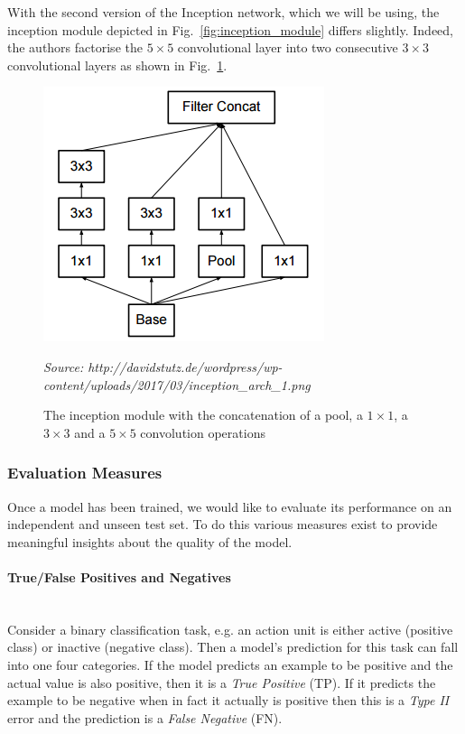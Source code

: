 \documentclass[12pt,twoside]{article}
\newcommand{\source}[1]{\vspace{-3pt} \caption*{ \footnotesize{\textit{Source: {#1}}}} }
\newcommand{\para}[1]{\paragraph{#1}\mbox{}\\}
\begin{document}
With the second version of the Inception network, which we will be using, the
inception module depicted in Fig.~\ref{fig:inception_module} differs slightly.
Indeed, the authors factorise the $5 \times 5$ convolutional layer into two
consecutive $3 \times 3$ convolutional layers as shown in
Fig.~\ref{fig:inception_v2_module}.

\begin{figure}[ht]

  \centering
  \includegraphics[scale=0.8]{figures/inception_v2_module.png}
  \caption{The inception module with the concatenation of a pool, a $1 \times
  1$, a $3 \times 3$ and a $5 \times 5$ convolution operations}
  \source{http://davidstutz.de/wordpress/wp-content/uploads/2017/03/inception\_arch\_1.png}
  \label{fig:inception_v2_module}
\end{figure}


\subsubsection{Evaluation Measures}

Once a model has been trained, we would like to evaluate its performance on an
independent and unseen test set. To do this various measures exist to provide
meaningful insights about the quality of the model.

\para{True/False Positives and Negatives}

Consider a binary classification task, e.g. an action unit is either active
(positive class) or inactive (negative class). Then a model's prediction for
this task can fall into one four categories. If the model predicts an example
to be positive and the actual value is also positive, then it is a
\textit{True Positive} (TP). If it predicts the example to be negative when in fact
it actually is positive then this is a \textit{Type II} error and the prediction
is a \textit{False Negative} (FN).
\end{document}

